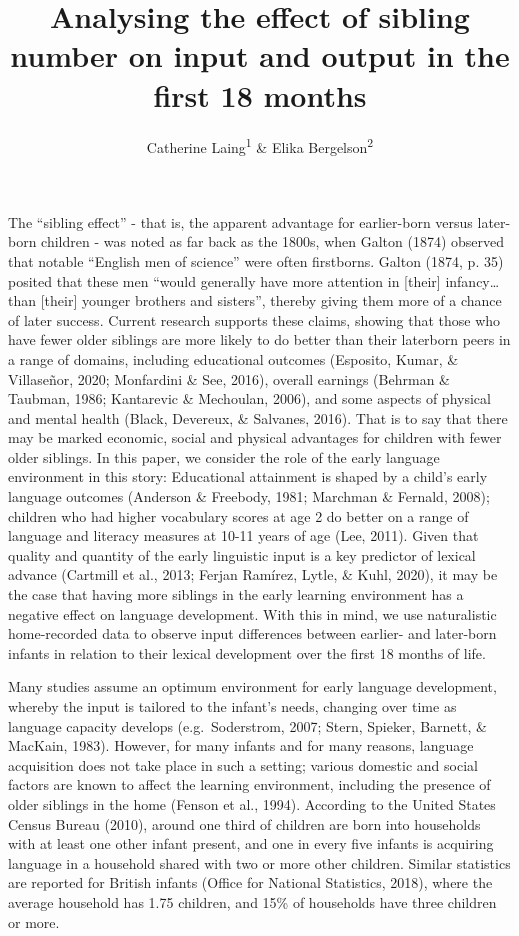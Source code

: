 \documentclass[
  english,
  man,floatsintext]{apa6}
\title{Analysing the effect of sibling number on input and output in the first 18 months}
\author{Catherine Laing\textsuperscript{1} \& Elika Bergelson\textsuperscript{2}}
\date{}
\affiliation{\vspace{0.5cm}\textsuperscript{1} Cardiff University, Cardiff, UK\\\textsuperscript{2} Duke University, Durham, NC, USA}
\begin{document}
\maketitle

The \enquote{sibling effect} - that is, the apparent advantage for earlier-born versus later-born children - was noted as far back as the 1800s, when Galton (1874) observed that notable \enquote{English men of science} were often firstborns. Galton (1874, p. 35) posited that these men \enquote{would generally have more attention in {[}their{]} infancy\ldots than {[}their{]} younger brothers and sisters}, thereby giving them more of a chance of later success. Current research supports these claims, showing that those who have fewer older siblings are more likely to do better than their laterborn peers in a range of domains, including educational outcomes (Esposito, Kumar, \& Villaseñor, 2020; Monfardini \& See, 2016), overall earnings (Behrman \& Taubman, 1986; Kantarevic \& Mechoulan, 2006), and some aspects of physical and mental health (Black, Devereux, \& Salvanes, 2016). That is to say that there may be marked economic, social and physical advantages for children with fewer older siblings. In this paper, we consider the role of the early language environment in this story: Educational attainment is shaped by a child's early language outcomes (Anderson \& Freebody, 1981; Marchman \& Fernald, 2008); children who had higher vocabulary scores at age 2 do better on a range of language and literacy measures at 10-11 years of age (Lee, 2011). Given that quality and quantity of the early linguistic input is a key predictor of lexical advance (Cartmill et al., 2013; Ferjan Ramírez, Lytle, \& Kuhl, 2020), it may be the case that having more siblings in the early learning environment has a negative effect on language development. With this in mind, we use naturalistic home-recorded data to observe input differences between earlier- and later-born infants in relation to their lexical development over the first 18 months of life.

Many studies assume an optimum environment for early language development, whereby the input is tailored to the infant's needs, changing over time as language capacity develops (e.g.~Soderstrom, 2007; Stern, Spieker, Barnett, \& MacKain, 1983). However, for many infants and for many reasons, language acquisition does not take place in such a setting; various domestic and social factors are known to affect the learning environment, including the presence of older siblings in the home (Fenson et al., 1994). According to the United States Census Bureau (2010), around one third of children are born into households with at least one other infant present, and one in every five infants is acquiring language in a household shared with two or more other children. Similar statistics are reported for British infants (Office for National Statistics, 2018), where the average household has 1.75 children, and 15\% of households have three children or more.
\end{document}
